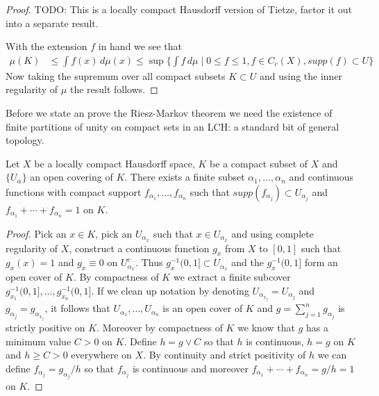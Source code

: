 \begin{proof}
TODO: This is a locally compact Hausdorff version of Tietze, factor it
out into a separate result.

With the extension $f$ in hand we see that 
\begin{align*}
\mu(K) &\leq \int f(x) \, d\mu(x) \leq \sup \lbrace \int f \, d\mu \mid 0 \leq f \leq 1, f \in
C_c(X), supp(f) \subset U \rbrace
\end{align*}
Now taking the supremum over all compact subsets $K \subset U$ and
using the inner regularity of $\mu$ the result follows.
\end{proof}


Before we state an prove the Riesz-Markov theorem we need the
existence of finite partitions of unity on compact sets in an LCH: a standard
bit of general topology.

\begin{lem}\label{PartitionOfUnity}Let $X$ be a locally compact Hausdorff space, $K$ be a
  compact subset of $X$ and $\lbrace U_\alpha \rbrace$ an open
  covering of $K$.  There exists a finite subset $\alpha_1, \dotsc,
  \alpha_n$ and continuous functions with compact support $f_{\alpha_1}, \dotsc,
  f_{\alpha_n}$ such that $supp(f_{\alpha_j}) \subset U_{\alpha_j}$
  and $f_{\alpha_1} + \dotsb + f_{\alpha_n} = 1$ on $K$.
\end{lem}
\begin{proof}
Pick an $x \in K$, pick an $U_{\alpha_x}$ such that $x \in U_{\alpha_x}$ and
using complete regularity of $X$, construct a continuous function
$g_x$ from $X$ to $[0,1]$ such that $g_x(x) = 1$ and
$g_x \equiv 0$ on $U_{\alpha_x}^c$.  Thus $g_x^{-1}(0,1] \subset
U_{\alpha_x}$ and the $g_x^{-1}(0,1]$ form an open cover of $K$.  By
compactness of $K$ we extract a finite subcover $g_{x_1}^{-1}(0,1],
\dotsc, g_{x_n}^{-1}(0,1]$.  If we clean up notation by denoting $U_{\alpha_{x_j}} =
U_{\alpha_j}$ and $g_{\alpha_j} = g_{\alpha_{x_j}}$, it follows that
$U_{\alpha_1}, \dotsc, U_{\alpha_n}$ is an open cover of $K$ and $g =
\sum_{j=1}^n g_{\alpha_j}$ is strictly positive on $K$.  Moreover by
compactness of $K$ we know that $g$ has a minimum value $C > 0$ on
$K$.  Define $h = g \vee C$ so that $h$ is continuous, $h = g$ on $K$ and $h
\geq C > 0$ everywhere on $X$.  By continuity and strict positivity of
$h$ we can define $f_{\alpha_j} = g_{\alpha_j}/h$ so that
$f_{\alpha_j}$ is continuous and moreover $f_{\alpha_1} + \dotsb +
f_{\alpha_n} = g/h = 1$ on $K$.
\end{proof}

